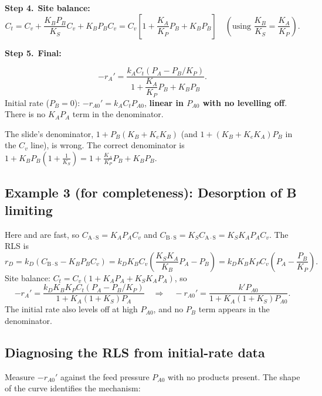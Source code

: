 \documentclass[11pt]{article}
\newcommand{\step}[1]{\par\smallskip\textcolor{stepgray}{\textbf{Step #1.}}\ }
\newcommand{\AS}[1]{\mathrm{#1\!\cdot\!S}}
\begin{document}
\step{4}\textbf{Site balance:}
\[
C_t=C_v+\frac{K_BP_B}{K_S}C_v+K_BP_BC_v=C_v\left[1+\frac{K_A}{K_P}P_B+K_BP_B\right]
\quad\left(\text{using }\frac{K_B}{K_S}=\frac{K_A}{K_P}\right).
\]
\step{5}\textbf{Final:}
\begin{keyresult}
\[
-r_A'=\frac{k_AC_t\left(P_A-P_B/K_P\right)}{1+\dfrac{K_A}{K_P}P_B+K_BP_B}.
\]
Initial rate ($P_B=0$): $-r_{A0}'=k_AC_tP_{A0}$, \textbf{linear in $P_{A0}$ with no levelling off}. There is no
$K_AP_A$ term in the denominator.
\end{keyresult}
\begin{mistake}
The slide's denominator, $1+P_B(K_B+K_eK_B)$ (and $1+(K_B+K_eK_A)P_B$ in the $C_v$ line), is wrong. The correct
denominator is $1+K_BP_B\left(1+\frac{1}{K_S}\right)=1+\frac{K_A}{K_P}P_B+K_BP_B$.
\end{mistake}

\subsection{Example 3 (for completeness): Desorption of B limiting}
Here  and  are fast, so $C_{\AS{A}}=K_AP_AC_v$ and
$C_{\AS{B}}=K_SC_{\AS{A}}=K_SK_AP_AC_v$. The RLS is
\[
r_D=k_D\left(C_{\AS{B}}-K_BP_BC_v\right)=k_DK_BC_v\left(\frac{K_SK_A}{K_B}P_A-P_B\right)=k_DK_BK_PC_v\left(P_A-\frac{P_B}{K_P}\right).
\]
Site balance: $C_t=C_v(1+K_AP_A+K_SK_AP_A)$, so
\[
-r_A'=\frac{k_DK_BK_PC_t\left(P_A-P_B/K_P\right)}{1+K_A(1+K_S)P_A}
\quad\Rightarrow\quad
-r_{A0}'=\frac{k'P_{A0}}{1+K_A(1+K_S)P_{A0}} .
\]
The initial rate also levels off at high $P_{A0}$, and no $P_B$ term appears in the denominator.

\subsection{Diagnosing the RLS from initial-rate data}
Measure $-r_{A0}'$ against the feed pressure $P_{A0}$ with no products present. The shape of the curve identifies the mechanism:
\end{document}
